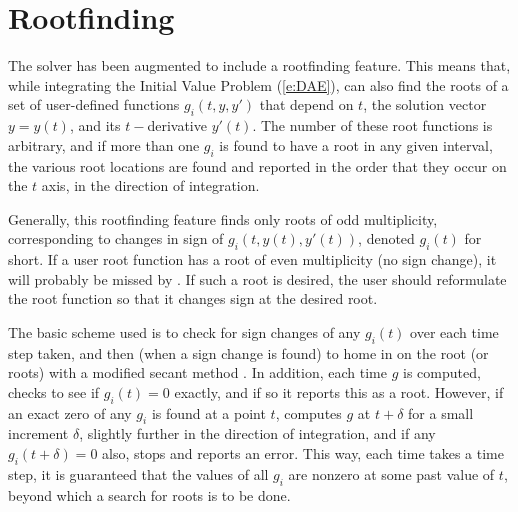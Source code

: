 \section{Rootfinding}\label{ss:rootfinding}

The {\ida} solver has been augmented to include a rootfinding
feature.  This means that, while integrating the Initial Value Problem
(\ref{e:DAE}), {\ida} can also find the roots of a set of user-defined
functions $g_i(t,y,y')$ that depend on $t$, the solution vector 
$y = y(t)$, and its $t-$derivative $y'(t)$.  The number of these root
functions is arbitrary, and if more than one $g_i$ is found to have a
root in any given interval, the various root locations are found and
reported in the order that they occur on the $t$ axis, in the
direction of integration.

Generally, this rootfinding feature finds only roots of odd
multiplicity, corresponding to changes in sign of $g_i(t,y(t),y'(t))$,
denoted $g_i(t)$ for short.  If a user root function has a root of
even multiplicity (no sign change), it will probably be missed by
{\ida}.  If such a root is desired, the user should reformulate the
root function so that it changes sign at the desired root.

The basic scheme used is to check for sign changes of any $g_i(t)$ over
each time step taken, and then (when a sign change is found) to home
in on the root (or roots) with a modified secant method \cite{HeSh:80}.  
In addition, each time $g$ is computed, {\ida} checks to see if 
$g_i(t) = 0$ exactly, and if so it reports this as a root.  However,
if an exact zero of any $g_i$ is found at a point $t$, {\ida}
computes $g$ at $t + \delta$ for a small increment $\delta$, slightly
further in the direction of integration, and if any $g_i(t + \delta)=0$ 
also, {\ida} stops and reports an error.  This way, each time
{\ida} takes a time step, it is guaranteed that the values of all
$g_i$ are nonzero at some past value of $t$, beyond which a search for
roots is to be done.


